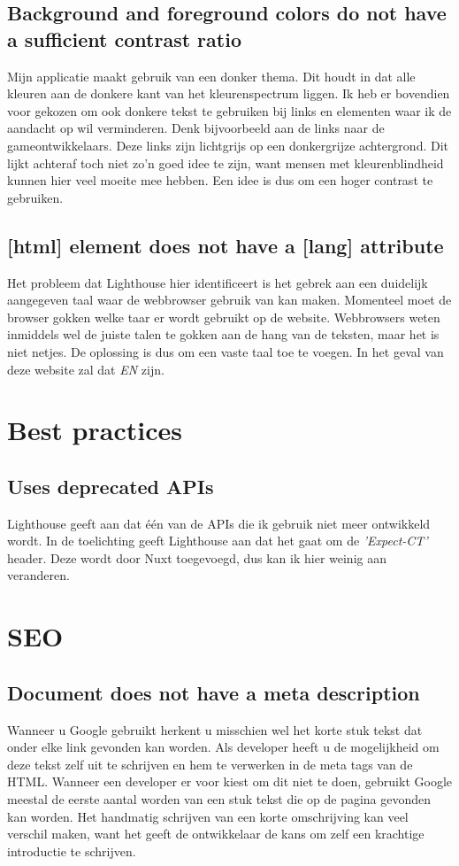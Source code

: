 \documentclass[a4paper]{report}
\begin{document}
    \subsection{Background and foreground colors do not have a sufficient contrast ratio}
    Mijn applicatie maakt gebruik van een donker thema. Dit houdt in dat alle kleuren aan de donkere kant van het kleurenspectrum liggen.
    Ik heb er bovendien voor gekozen om ook donkere tekst te gebruiken bij links en elementen waar ik de aandacht op wil verminderen.
    Denk bijvoorbeeld aan de links naar de gameontwikkelaars. Deze links zijn lichtgrijs op een donkergrijze achtergrond. Dit lijkt achteraf
    toch niet zo'n goed idee te zijn, want mensen met kleurenblindheid kunnen hier veel moeite mee hebben. Een idee is dus om een hoger contrast te gebruiken.

    \subsection{[html] element does not have a [lang] attribute}
    Het probleem dat Lighthouse hier identificeert is het gebrek aan een duidelijk aangegeven taal waar de webbrowser gebruik van kan maken.
    Momenteel moet de browser gokken welke taar er wordt gebruikt op de website. Webbrowsers weten inmiddels wel de juiste talen te gokken aan de hang van de teksten,
    maar het is niet netjes. De oplossing is dus om een vaste taal toe te voegen. In het geval van deze website zal dat \textit{EN} zijn.

    \section{Best practices}
    \subsection{Uses deprecated APIs}
    Lighthouse geeft aan dat één van de APIs die ik gebruik niet meer ontwikkeld wordt.
    In de toelichting geeft Lighthouse aan dat het gaat om de \textit{'Expect-CT'} header. Deze wordt door Nuxt toegevoegd, dus kan ik hier weinig aan veranderen.

    \section{SEO}
    \subsection{Document does not have a meta description}
    Wanneer u Google gebruikt herkent u misschien wel het korte stuk tekst dat onder elke link gevonden kan worden.
    Als developer heeft u de mogelijkheid om deze tekst zelf uit te schrijven en hem te verwerken in de {\selectfont meta} tags van de HTML.
    Wanneer een developer er voor kiest om dit niet te doen, gebruikt Google meestal de eerste aantal worden van een stuk tekst die op de pagina gevonden kan worden.
    Het handmatig schrijven van een korte omschrijving kan veel verschil maken, want het geeft de ontwikkelaar de kans om zelf een krachtige introductie te schrijven.
\end{document}
